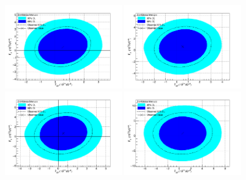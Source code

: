\begin{figure}[htp]
\centering
\includegraphics[width=0.45\textwidth]{figures/aQGC/lll-Un-Unit.png}
\includegraphics[width=0.45\textwidth]{figures/aQGC/lll-3000.png}
\includegraphics[width=0.45\textwidth]{figures/aQGC/lll-2000.png}
\includegraphics[width=0.45\textwidth]{figures/aQGC/lll-1000.png}

\end{figure}
